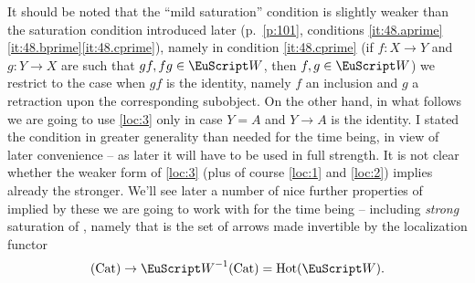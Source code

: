 It should be noted that the ``mild saturation'' condition is slightly
weaker than the saturation condition introduced later (p.\
\ref{p:101}, conditions
\ref{it:48.aprime}\ref{it:48.bprime}\ref{it:48.cprime}), namely in
condition \ref{it:48.cprime} (if $f:X\to Y$ and $g:Y\to X$ are such
that $gf,fg\in\scrW$, then $f,g\in\scrW$) we restrict to the case when
$gf$ is the identity, namely $f$ an inclusion and $g$ a retraction
upon the corresponding subobject. On the other hand, in what follows
we are going to use \ref{loc:3} only in case $Y=A$ and $Y\to A$ is the
identity. I stated the condition in greater generality than needed for
the time being, in view of later convenience -- as later it will have
to be used in full strength. It is not clear whether the weaker form
of \ref{loc:3} (plus of course \ref{loc:1} and \ref{loc:2}) implies
already the stronger. We'll see later a number of nice further
properties of \scrW{} implied by these we are going to work with for
the time being -- including \emph{strong} saturation of \scrW, namely
that \scrW{} is the set of arrows made invertible by the localization
functor
\[\Cat\to\scrW^{-1}\Cat=\HotOf(\scrW).\]
